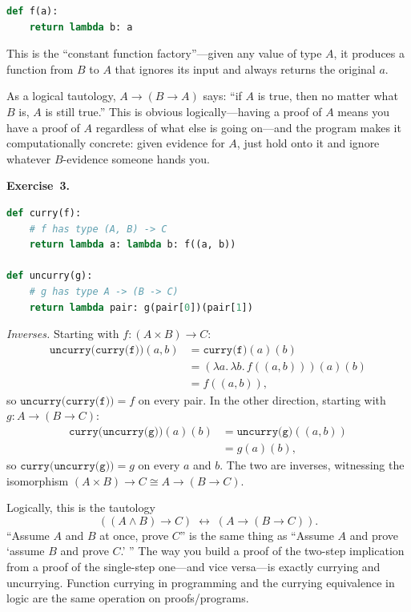\documentclass[11pt]{article}
\begin{document}
\begin{lstlisting}[language=Python]
def f(a):
    return lambda b: a
\end{lstlisting}

This is the ``constant function factory''---given any value of type $A$,
it produces a function from $B$ to $A$ that ignores its input and always
returns the original $a$.

As a logical tautology, $A \to (B \to A)$ says: ``if $A$ is true, then
no matter what $B$ is, $A$ is still true.''  This is obvious
logically---having a proof of $A$ means you have a proof of $A$
regardless of what else is going on---and the program makes it
computationally concrete: given evidence for $A$, just hold onto it and
ignore whatever $B$-evidence someone hands you.

\medskip
\textbf{Exercise~3.}
\begin{lstlisting}[language=Python]
def curry(f):
    # f has type (A, B) -> C
    return lambda a: lambda b: f((a, b))

def uncurry(g):
    # g has type A -> (B -> C)
    return lambda pair: g(pair[0])(pair[1])
\end{lstlisting}

\emph{Inverses.}  Starting with $f : (A \times B) \to C$:
\begin{align*}
  \texttt{uncurry(curry(f))}(a, b)
    &= \texttt{curry(f)}(a)(b)                                 \\
    &= (\lambda a.\,\lambda b.\, f((a,b)))(a)(b)               \\
    &= f((a,b)),
\end{align*}
so $\texttt{uncurry(curry(f))} = f$ on every pair.  In the other
direction, starting with $g : A \to (B \to C)$:
\begin{align*}
  \texttt{curry(uncurry(g))}(a)(b)
    &= \texttt{uncurry(g)}((a,b))                              \\
    &= g(a)(b),
\end{align*}
so $\texttt{curry(uncurry(g))} = g$ on every $a$ and $b$.  The two
are inverses, witnessing the isomorphism $(A \times B) \to C \cong
A \to (B \to C)$.

Logically, this is the tautology
\[
  ((A \wedge B) \to C) \;\leftrightarrow\; (A \to (B \to C)).
\]
``Assume $A$ and $B$ at once, prove $C$'' is the same thing as
``Assume $A$ and prove `assume $B$ and prove $C$.' ''  The way you
build a proof of the two-step implication from a proof of the
single-step one---and vice versa---is exactly currying and
uncurrying.  Function currying in programming and the currying
equivalence in logic are the same operation on proofs/programs.
\end{document}
